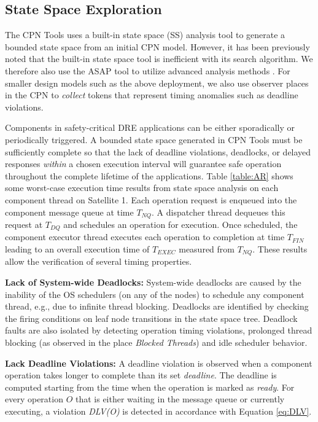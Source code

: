 \subsection{State Space Exploration}


The CPN Tools uses a built-in state space (SS) analysis tool to generate a bounded state space from an initial CPN model. However, it has been previously noted \cite{CPNTwoInterfaces} that the built-in state space tool is inefficient with its search algorithm. We therefore also use the ASAP tool \cite{ASAP} to utilize advanced analysis methods \cite{Christensen2001}. For smaller design models such as the above deployment, we also use observer places \cite{Alpern1989} in the CPN to \emph{collect} tokens that represent timing anomalies such as deadline violations.

Components in safety-critical DRE applications can be either sporadically or periodically triggered. A bounded state space generated in CPN Tools must be sufficiently complete so that the lack of deadline violations, deadlocks, or delayed responses \emph{within} a chosen execution interval will guarantee safe operation throughout the complete lifetime of the applications. Table \ref{table:AR} shows some worst-case execution time results from state space analysis on each component thread on Satellite 1. Each operation request is enqueued into the component message queue at time $T_{NQ}$. A dispatcher thread dequeues this request at $T_{DQ}$ and schedules an operation for execution. Once scheduled, the component executor thread executes each operation to completion at time $T_{FIN}$ leading to an overall execution time of $T_{EXEC}$ measured from $T_{NQ}$. These results allow the verification of several timing properties. 

\textbf{Lack of System-wide Deadlocks:} System-wide deadlocks are caused by the inability of the OS schedulers (on any of the nodes) to schedule any component thread, e.g., due to infinite thread blocking. Deadlocks are identified by checking the firing conditions on leaf node transitions in the state space tree. Deadlock faults are also isolated by detecting operation timing violations, prolonged thread blocking (as observed in the place \emph{Blocked Threads}) and idle scheduler behavior. 

\textbf{Lack Deadline Violations:}
A deadline violation is observed when a component operation takes longer to complete than its set \emph{deadline}. The deadline is computed starting from the time when the operation is marked as \emph{ready}. For every operation $O$ that is either waiting in the message queue or currently executing, a violation \emph{DLV(O)} is detected in accordance with Equation \ref{eq:DLV}.

